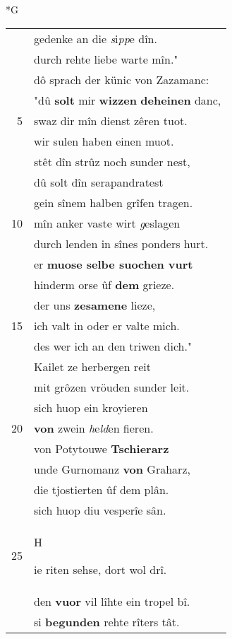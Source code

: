 \documentclass[8pt,a4paper,notitlepage]{article}
\begin{document}
\newpage
\begin{table}[ht]
\begin{minipage}[t]{0.5\linewidth}
\small
\begin{center}*G
\end{center}
\begin{tabular}{rl}
 & gedenke an die \textit{s}i\textit{pp}e dîn.\\ 
 & durch rehte liebe warte mîn."\\ 
 & dô sprach der künic von Zazamanc:\\ 
 & "dû \textbf{solt} mir \textbf{wizzen} \textbf{deheinen} danc,\\ 
5 & swaz dir mîn dienst zêren tuot.\\ 
 & wir sulen haben einen muot.\\ 
 & stêt dîn strûz noch sunder nest,\\ 
 & dû solt dîn serapandratest\\ 
 & gein sînem halben grîfen tragen.\\ 
10 & mîn anker vaste wirt \textit{g}eslagen\\ 
 & durch lenden in sînes ponders hurt.\\ 
 & er \textbf{muose selbe suochen vurt}\\ 
 & hinderm orse ûf \textbf{dem} grieze.\\ 
 & der uns \textbf{zesamene} lieze,\\ 
15 & ich valt in oder er valte mich.\\ 
 & des wer ich an den triwen dich."\\ 
 & Kailet ze herbergen reit\\ 
 & mit grôzen vröuden sunder leit.\\ 
 & sich huop ein kroyieren\\ 
20 & \textbf{von} zwein \textit{h}e\textit{ld}en fieren.\\ 
 & von Potytouwe \textbf{Tschierarz}\\ 
 & unde Gurnomanz \textbf{von} Graharz,\\ 
 & die tjostierten ûf dem plân.\\ 
 & sich huop diu vesperîe sân.\\ 
25 & \begin{large}H\end{large}ie riten sehse, dort wol drî.\\ 
 & den \textbf{vuor} vil lîhte ein tropel bî.\\ 
 & si \textbf{begunden} rehte rîters tât.\\ 

\end{tabular}
\end{minipage}
\end{table}
\end{document}
